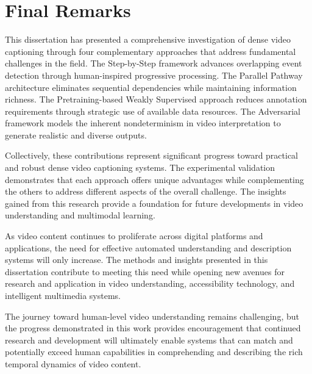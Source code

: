 \section{Final Remarks}
\label{sec:final_remarks}

This dissertation has presented a comprehensive investigation of dense video captioning through four complementary approaches that address fundamental challenges in the field. The Step-by-Step framework advances overlapping event detection through human-inspired progressive processing. The Parallel Pathway architecture eliminates sequential dependencies while maintaining information richness. The Pretraining-based Weakly Supervised approach reduces annotation requirements through strategic use of available data resources. The Adversarial framework models the inherent nondeterminism in video interpretation to generate realistic and diverse outputs.

Collectively, these contributions represent significant progress toward practical and robust dense video captioning systems. The experimental validation demonstrates that each approach offers unique advantages while complementing the others to address different aspects of the overall challenge. The insights gained from this research provide a foundation for future developments in video understanding and multimodal learning.

As video content continues to proliferate across digital platforms and applications, the need for effective automated understanding and description systems will only increase. The methods and insights presented in this dissertation contribute to meeting this need while opening new avenues for research and application in video understanding, accessibility technology, and intelligent multimedia systems.

The journey toward human-level video understanding remains challenging, but the progress demonstrated in this work provides encouragement that continued research and development will ultimately enable systems that can match and potentially exceed human capabilities in comprehending and describing the rich temporal dynamics of video content.